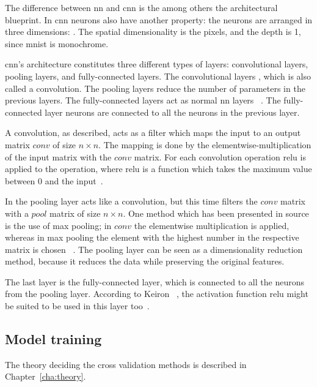The difference between \gls{nn} and \gls{cnn} is the among others the architectural blueprint. In \gls{cnn} neurons also have another property: the neurons are arranged in three dimensions: . The spatial dimensionality is the pixels, and the depth is 1, since \gls{mnist} is monochrome.


\gls{cnn}'s architecture constitutes three different types of layers: convolutional layers, pooling layers, and fully-connected layers. The convolutional layers , which is also called a convolution. The pooling layers reduce the number of parameters in the previous layers. The fully-connected layers act as normal \gls{nn} layers ~\cite{introduction-to-cnn}. The fully-connected layer neurons are connected to all the neurons in the previous layer.


A convolution, as described, acts as a filter which maps the input to an output matrix $conv$ of size $n \times n$. The mapping is done by the elementwise-multiplication of the input matrix with the $conv$ matrix. For each convolution operation \gls{relu} is applied to the operation, where \gls{relu} is a function which takes the maximum value between 0 and the input~\cite{google-cnn}.


In the pooling layer acts like a convolution, but this time filters the $conv$ matrix with a $pool$ matrix of size $n \times n$. One method which has been presented in source is the use of max pooling; in $conv$ the elementwise multiplication is applied, whereas in max pooling the element with the highest number in the respective matrix is chosen ~\cite{google-cnn}. The pooling layer can be seen as a dimensionality reduction method, because it reduces the data while preserving the original features.


The last layer is the fully-connected layer, which is connected to all the neurons from the pooling layer. According to Keiron ~\cite{introduction-to-cnn}, the activation function \gls{relu} might be suited to be used in this layer too~\cite{lecun-mnist-database}.

\subsection{Model training}\label{subsec:model-training}
The theory deciding the cross validation methods is described in Chapter~\ref{cha:theory}.


